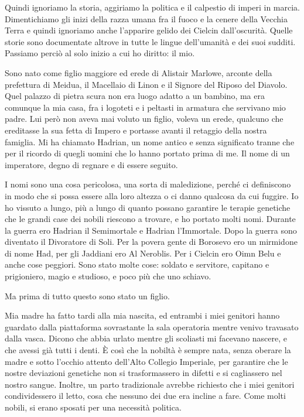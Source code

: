 Quindi ignoriamo la storia, aggiriamo la politica e il calpestio di
imperi in marcia. Dimentichiamo gli inizi della razza umana fra il fuoco
e la cenere della Vecchia Terra e quindi ignoriamo anche l'apparire
gelido dei Cielcin dall'oscurità. Quelle storie sono documentate altrove
in tutte le lingue dell'umanità e dei suoi sudditi. Passiamo perciò al
solo inizio a cui ho diritto: il mio.

Sono nato come figlio maggiore ed erede di Alistair Marlowe, arconte
della prefettura di Meidua, il Macellaio di Linon e il Signore del
Riposo del Diavolo. Quel palazzo di pietra scura non era luogo adatto a
un bambino, ma era comunque la mia casa, fra i logoteti e i peltasti in
armatura che servivano mio padre. Lui però non aveva mai voluto un
figlio, voleva un erede, qualcuno che ereditasse la sua fetta di Impero
e portasse avanti il retaggio della nostra famiglia. Mi ha chiamato
Hadrian, un nome antico e senza significato tranne che per il ricordo di
quegli uomini che lo hanno portato prima di me. Il nome di un
imperatore, degno di regnare e di essere seguito.

I nomi sono una cosa pericolosa, una sorta di maledizione, perché ci
definiscono in modo che si possa essere alla loro altezza o ci danno
qualcosa da cui fuggire. Io ho vissuto a lungo, più a lungo di quanto
possano garantire le terapie genetiche che le grandi case dei nobili
riescono a trovare, e ho portato molti nomi. Durante la guerra ero
Hadrian il Semimortale e Hadrian l'Immortale. Dopo la guerra sono
diventato il Divoratore di Soli. Per la povera gente di Borosevo ero un
mirmidone di nome Had, per gli Jaddiani ero Al Neroblis. Per i Cielcin
ero Oimn Belu e anche cose peggiori. Sono stato molte cose: soldato e
servitore, capitano e prigioniero, magio e studioso, e poco più che uno
schiavo.

Ma prima di tutto questo sono stato un figlio.

\begin{figure}
	\centering
	\def\svgwidth{\columnwidth}
	\scalebox{0.2}{}
\end{figure}

Mia madre ha fatto tardi alla mia nascita, ed entrambi i miei genitori
hanno guardato dalla piattaforma sovrastante la sala operatoria mentre
venivo travasato dalla vasca. Dicono che abbia urlato mentre gli
scoliasti mi facevano nascere, e che avessi già tutti i denti. È così
che la nobiltà è sempre nata, senza oberare la madre e sotto l'occhio
attento dell'Alto Collegio Imperiale, per garantire che le nostre
deviazioni genetiche non si trasformassero in difetti e si cagliassero
nel nostro sangue. Inoltre, un parto tradizionale avrebbe richiesto che
i miei genitori condividessero il letto, cosa che nessuno dei due era
incline a fare. Come molti nobili, si erano sposati per una necessità
politica.

